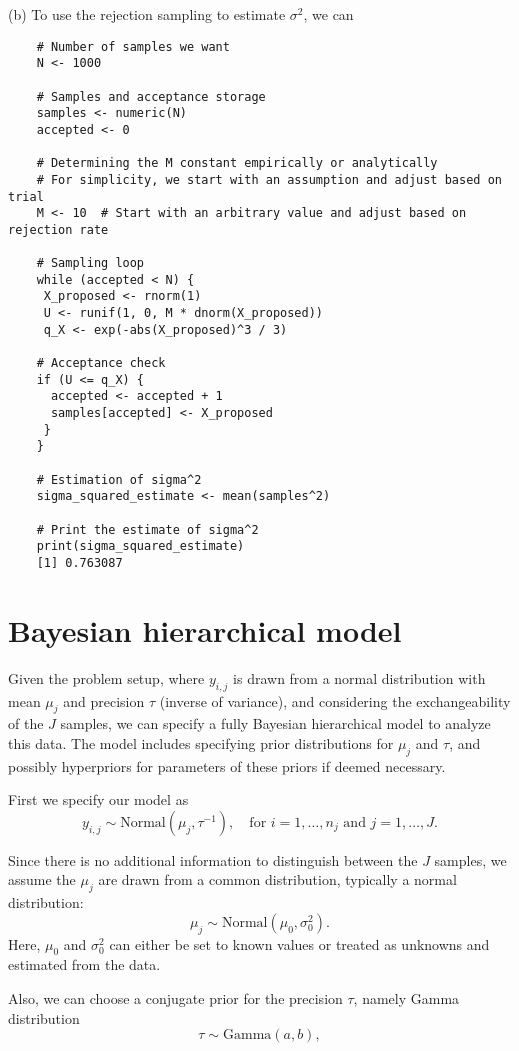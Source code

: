 \documentclass{article}
\begin{document}
(b) To use the rejection sampling to estimate $\sigma^2$, we can
\begin{verbatim}
    # Number of samples we want
    N <- 1000

    # Samples and acceptance storage
    samples <- numeric(N)
    accepted <- 0

    # Determining the M constant empirically or analytically
    # For simplicity, we start with an assumption and adjust based on trial
    M <- 10  # Start with an arbitrary value and adjust based on rejection rate

    # Sampling loop
    while (accepted < N) {
     X_proposed <- rnorm(1)
     U <- runif(1, 0, M * dnorm(X_proposed))
     q_X <- exp(-abs(X_proposed)^3 / 3)
  
    # Acceptance check
    if (U <= q_X) {
      accepted <- accepted + 1
      samples[accepted] <- X_proposed
     }
    }

    # Estimation of sigma^2
    sigma_squared_estimate <- mean(samples^2)

    # Print the estimate of sigma^2
    print(sigma_squared_estimate)
    [1] 0.763087
\end{verbatim}

\section{Bayesian hierarchical model}
Given the problem setup, where \( y_{i,j} \) is drawn from a normal distribution with mean \( \mu_j \) and precision \( \tau \) (inverse of variance), and considering the exchangeability of the \( J \) samples, we can specify a fully Bayesian hierarchical model to analyze this data. The model includes specifying prior distributions for \( \mu_j \) and \( \tau \), and possibly hyperpriors for parameters of these priors if deemed necessary.

First we specify our model as
   \[
   y_{i,j} \sim \text{Normal}(\mu_j, \tau^{-1}), \quad \text{for } i = 1, \dots, n_j \text{ and } j = 1, \dots, J.
   \]

   Since there is no additional information to distinguish between the \( J \) samples, we assume the \( \mu_j \) are drawn from a common distribution, typically a normal distribution:
   \[
   \mu_j \sim \text{Normal}(\mu_0, \sigma^2_0).
   \]
   Here, \( \mu_0 \) and \( \sigma^2_0 \) can either be set to known values or treated as unknowns and estimated from the data.

Also, we can choose a conjugate prior for the precision $\tau$, namely Gamma distribution
   \[
   \tau \sim \text{Gamma}(a, b),
   \]
\end{document}
